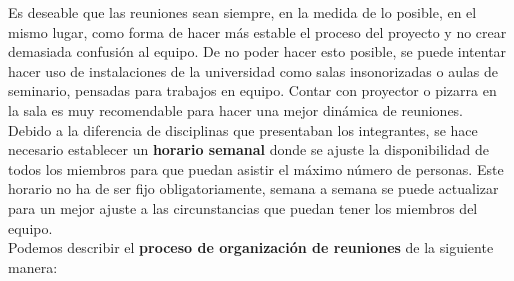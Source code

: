 Es deseable que las reuniones sean siempre, en la medida de lo posible, en el mismo lugar, como forma de hacer más estable el proceso del proyecto y no crear demasiada confusión al equipo. De no poder hacer esto posible, se puede intentar hacer uso de instalaciones de la universidad como salas insonorizadas o aulas de seminario, pensadas para trabajos en equipo. Contar con proyector o pizarra en la sala es muy recomendable para hacer una mejor dinámica de reuniones.\\

Debido a la diferencia de disciplinas que presentaban los integrantes, se hace necesario establecer un \textbf{horario semanal} donde se ajuste la disponibilidad de todos los miembros para que puedan asistir el máximo número de personas. Este horario no ha de ser fijo obligatoriamente, semana a semana se puede actualizar para un mejor ajuste a las circunstancias que puedan tener los miembros del equipo.\\

Podemos describir el \textbf{proceso de organización de reuniones} de la siguiente manera:

